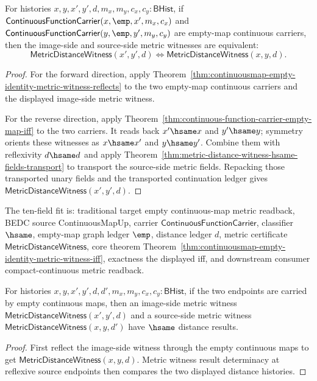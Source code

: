 \begin{theorem}
\label{thm:continuousmap-empty-identity-metric-witness-iff}
For histories $x,y,x',y',d,m_x,m_y,c_x,c_y:\mathsf{BHist}$, if
$\mathsf{ContinuousFunctionCarrier}(x,\emp,x',m_x,c_x)$ and
$\mathsf{ContinuousFunctionCarrier}(y,\emp,y',m_y,c_y)$ are empty-map
continuous carriers, then the image-side and source-side metric witnesses are
equivalent:
$$
\mathsf{MetricDistanceWitness}(x',y',d)\Longleftrightarrow
\mathsf{MetricDistanceWitness}(x,y,d).
$$
\end{theorem}
\begin{proof}
For the forward direction, apply
Theorem~\ref{thm:continuousmap-empty-identity-metric-witness-reflects} to the
two empty-map continuous carriers and the displayed image-side metric witness.

For the reverse direction, apply
Theorem~\ref{thm:continuous-function-carrier-empty-map-iff} to the two
carriers. It reads back $x'\hsame x$ and $y'\hsame y$; symmetry orients these
witnesses as $x\hsame x'$ and $y\hsame y'$. Combine them with reflexivity
$d\hsame d$ and apply
Theorem~\ref{thm:metric-distance-witness-hsame-fields-transport} to transport
the source-side metric fields. Repacking those transported unary fields and
the transported continuation ledger gives
$\mathsf{MetricDistanceWitness}(x',y',d)$.
\end{proof}

The ten-field fit is: traditional target empty continuous-map metric readback,
BEDC source ContinuousMapUp, carrier $\mathsf{ContinuousFunctionCarrier}$,
classifier $\hsame$, empty-map graph ledger $\emp$, distance ledger $d$,
metric certificate $\mathsf{MetricDistanceWitness}$, core theorem
Theorem~\ref{thm:continuousmap-empty-identity-metric-witness-iff}, exactness
the displayed iff, and downstream consumer compact-continuous metric readback.

\begin{theorem}
\label{thm:continuousmap-empty-identity-metric-result-deterministic}
For histories $x,y,x',y',d,d',m_x,m_y,c_x,c_y:\mathsf{BHist}$, if the two
endpoints are carried by empty continuous maps, then an image-side metric
witness $\mathsf{MetricDistanceWitness}(x',y',d)$ and a source-side metric
witness $\mathsf{MetricDistanceWitness}(x,y,d')$ have $\hsame$ distance
results.
\end{theorem}
\begin{proof}
First reflect the image-side witness through the empty continuous maps to get
$\mathsf{MetricDistanceWitness}(x,y,d)$. Metric witness result determinacy at
reflexive source endpoints then compares the two displayed distance histories.
\end{proof}

